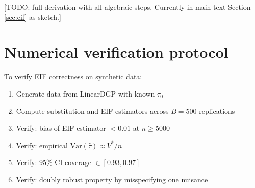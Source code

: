 \documentclass[11pt]{article}
\theoremstyle{plain}
\theoremstyle{definition}
\theoremstyle{remark}
\begin{document}
[TODO: full derivation with all algebraic steps. Currently in main text Section \ref{sec:eif} as sketch.]

\section{Numerical verification protocol}
\label{app:numerical}

To verify EIF correctness on synthetic data:
\begin{enumerate}[itemsep=2pt]
    \item Generate data from LinearDGP with known $\tau_0$
    \item Compute substitution and EIF estimators across $B = 500$ replications
    \item Verify: bias of EIF estimator $< 0.01$ at $n \geq 5000$
    \item Verify: empirical $\text{Var}(\hat\tau) \approx V^*/n$
    \item Verify: 95\% CI coverage $\in [0.93, 0.97]$
    \item Verify: doubly robust property by misspecifying one nuisance
\end{enumerate}
\end{document}
